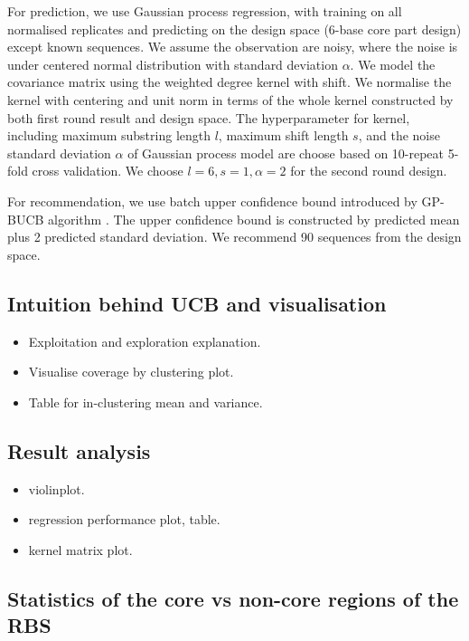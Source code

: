 For prediction, we use Gaussian process regression, with training on all normalised replicates and predicting on the design space (6-base core part design) except known sequences. 
We assume the observation are noisy, where the noise is under centered normal distribution with standard deviation $\alpha$.  
We model the covariance matrix using the weighted degree kernel with shift. 
We normalise the kernel with centering and unit norm in terms of the whole kernel constructed by both first round result and design space. 
The hyperparameter for kernel, including maximum substring length  $l$, maximum shift length $s$, and the noise standard deviation $\alpha$ of Gaussian process model are choose based on 10-repeat 5-fold cross validation. 
We choose $l=6, s= 1, \alpha = 2$ for the second round design. 

For recommendation, we use batch upper confidence bound introduced by GP-BUCB algorithm \cite{desautels2012parallelizing}. 
The upper confidence bound is constructed by predicted mean plus 2 predicted standard deviation.   
We recommend 90 sequences from the design space. 



\subsection{Intuition behind UCB and visualisation}

\begin{itemize}
    \item Exploitation and exploration explanation.
    \item Visualise coverage by clustering plot.
    \item Table for in-clustering mean and variance.
\end{itemize}

\subsection{Result analysis}

\begin{itemize}
    \item violinplot.
    \item regression performance plot, table.
    \item kernel matrix plot.
\end{itemize}

\subsection{Statistics of the core vs non-core regions of the RBS}

